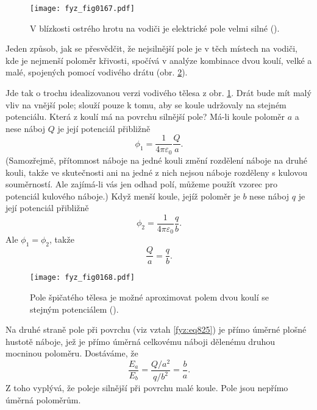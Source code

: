   \begin{figure}[ht!]  %
    \centering
    \texttt{[image: fyz\_fig0167.pdf]}
    \caption{V blízkosti ostrého hrotu na vodiči je elektrické pole velmi silné
             (\cite[s.~116]{Feynman02}).}
    \label{fyz:fig0167}
  \end{figure}

  Jeden způsob, jak se přesvědčit, že nejsilnější pole je v těch místech na vodiči, kde je nejmenší
  poloměr křivosti, spočívá v analýze kombinace dvou koulí, velké a malé, spojených pomocí vodivého
  drátu (obr. \ref{fyz:fig0168}).  

  Jde tak o trochu idealizovanou verzi vodivého tělesa z obr. \ref{fyz:fig0167}. Drát bude mít malý
  vliv na vnější pole; slouží pouze k tomu, aby se koule udržovaly na stejném potenciálu. Která z
  koulí má na povrchu silnější pole? Má-li koule poloměr \(a\) a nese náboj \(Q\) je její potenciál
  přibližně
  \begin{equation*}
    ϕ_1=\dfrac{1}{4π\varepsilon_0}\dfrac{Q}{a}.
  \end{equation*}
  (Samozřejmě, přítomnost náboje na jedné kouli změní rozdělení náboje na druhé kouli, takže 
  ve skutečnosti ani na jedné z nich nejsou náboje rozděleny s kulovou souměrností. Ale zajímá-li
  vás jen odhad polí, můžeme použít vzorec pro potenciál kulového náboje.) Když menší koule, jejíž
  poloměr je \(b\) nese náboj \(q\) je její potenciál přibližně
  \begin{equation*}
    ϕ_2=\dfrac{1}{4π\varepsilon_0}\dfrac{q}{b}.
  \end{equation*}
  Ale \(ϕ_1=ϕ_2\), takže
  \begin{equation*}
    \dfrac{Q}{a}=\dfrac{q}{b}.
  \end{equation*}
    
  \begin{figure}[ht!]  %
    \centering
    \texttt{[image: fyz\_fig0168.pdf]}
    \caption{Pole špičatého tělesa je možné aproximovat polem dvou koulí se stejným potenciálem
             (\cite[s.~116]{Feynman02}).}
    \label{fyz:fig0168}
  \end{figure}

  Na druhé straně pole při povrchu (viz vztah \ref{fyz:eq825}) je přímo úměrné
  plošné hustotě náboje, jež je přímo úměrná celkovému náboji dělenému druhou mocninou poloměru.
  Dostáváme, že
  \begin{equation}\label{fyz:eq826}
    \dfrac{E_a}{E_b}=\dfrac{Q/a^2}{q/b^2}=\dfrac{b}{a}.
  \end{equation}
  Z toho vyplývá, že poleje silnější při povrchu malé koule. Pole jsou nepřímo úměrná poloměrům.

